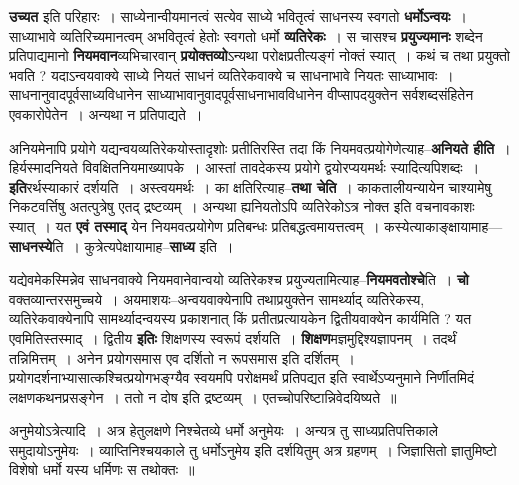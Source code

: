 \documentclass[article,12pt,a4paper]{memoir}
\begin{document}
	  \pstart \textbf{उच्यत} इति परिहारः । साध्येनान्वीयमानत्वं सत्येव साध्ये भवितृत्वं साधनस्य स्वगतो \textbf{धर्मोऽन्वयः} । साध्याभावे व्यतिरिच्यमानत्वम् अभवितृत्वं हेतोः स्वगतो धर्मो \textbf{व्यतिरेकः} । स चासश्च \textbf{प्रयुज्यमानः} शब्देन प्रतिपाद्यमानो \textbf{नियमवान}व्यभिचारवान् \textbf{प्रयोक्तव्यो}ऽन्यथा परोक्षप्रतीत्यङ्गं नोक्तं स्यात् । कथं च तथा प्रयुक्तो भवति ? यदाऽन्वयवाक्ये साध्ये नियतं साधनं व्यतिरेकवाक्ये च साधनाभावे नियतः साध्याभावः । साधनानुवादपूर्वसाध्यविधानेन साध्याभावानुवादपूर्वसाधनाभावविधानेन वीप्सापदयुक्तेन सर्वशब्दसंहितेन एवकारोपेतेन । अन्यथा न प्रतिपाद्यते ।
	\pend
      

	  \pstart अनियमेनापि प्रयोगे यद्यन्वयव्यतिरेकयोस्तादृशोः प्रतीतिरस्ति तदा किं नियमवत्प्रयोगेणेत्याह--\textbf{अनियते हीति} । हिर्यस्मादनियते विवक्षितनियमाख्यापके । आस्तां तावदेकस्य प्रयोगे द्वयोरप्ययमर्थः स्यादित्यपिशब्दः । \textbf{इति}रर्थस्याकारं दर्शयति । अस्त्वयमर्थः । का क्षतिरित्याह--\textbf{तथा चेति} । काकतालीयन्यायेन चाश्यामेषु निकटवर्त्तिषु अतत्पुत्रेषु एतद् द्रष्टव्यम् । अन्यथा ह्यनियतोऽपि व्यतिरेकोऽत्र नोक्त इति वचनावकाशः स्यात् । यत \textbf{एवं तस्माद्} येन नियमवत्प्रयोगेण प्रतिबन्धः प्रतिबद्धत्वमायत्तत्वम् । कस्येत्याकाङ्क्षायामाह—\textbf{साधनस्ये}ति । कुत्रेत्यपेक्षायामाह--\textbf{साध्य} इति ।
	\pend
      

	  \pstart यद्येवमेकस्मिन्नेव साधनवाक्ये नियमवानेवान्वयो व्यतिरेकश्च प्रयुज्यतामित्याह--\textbf{नियमवतोश्चे}ति । \textbf{चो} वक्तव्यान्तरसमुच्चये । अयमाशयः--अन्वयवाक्येनापि तथाप्रयुक्तेन सामर्थ्याद् व्यतिरेकस्य, व्यतिरेकवाक्येनापि सामर्थ्यादन्वयस्य प्रकाशनात् किं प्रतीतप्रत्यायकेन द्वितीयवाक्येन कार्यमिति ? यत एवमितिस्तस्माद् । द्वितीय \textbf{इतिः} शिक्षणस्य स्वरूपं दर्शयति । \textbf{शिक्षण}मज्ञमुद्दिश्यज्ञापनम् । तदर्थं तन्निमित्तम् । अनेन प्रयो\leavevmode{}गसमास एव दर्शितो न रूपसमास इति दर्शितम् । प्रयोगदर्शनाभ्यासात्कश्चित्प्रयोगभङ्ग्यैव स्वयमपि परोक्षमर्थं प्रतिपद्यत इति स्वार्थेऽप्यनुमाने निर्णीतमिदं लक्षणकथनप्रसङ्गेन । ततो न दोष इति द्रष्टव्यम् । एतच्चोपरिष्टान्निवेदयिष्यते ॥
	\pend
	  \bigskip
	  \begingroup
	

	  \pstart अनुमेयोऽत्रेत्यादि । अत्र हेतुलक्षणे निश्चेतव्ये धर्मो अनुमेयः । अन्यत्र तु साध्यप्रतिपत्तिकाले समुदायोऽनुमेयः । व्याप्तिनिश्चयकाले तु धर्मोऽनुमेय इति दर्शयितुम् अत्र ग्रहणम् । जिज्ञासितो ज्ञातुमिष्टो विशेषो धर्मो यस्य धर्मिणः स तथोक्तः ॥
	\pend
        
\end{document}
